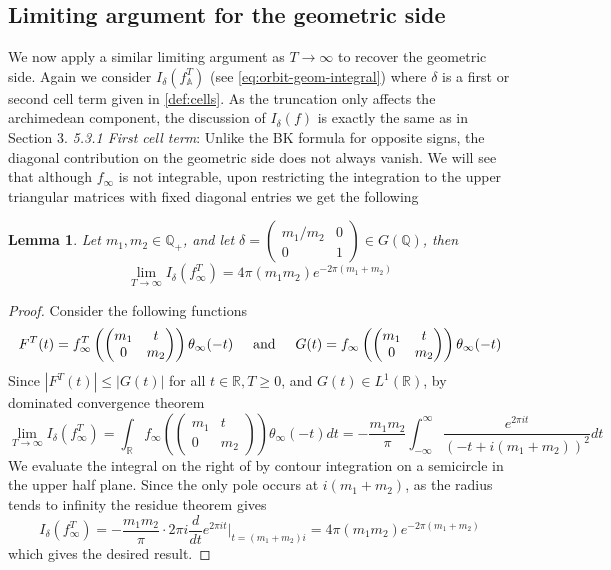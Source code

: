 \documentclass{article}
\newtheorem{lemma}[theorem]{Lemma}
\numberwithin{equation}{section}
\begin{document}
\subsection{Limiting argument for the geometric side}
We now apply a similar limiting argument as $T \to \infty$ to recover the geometric side. Again we consider $I_\delta(f_\mathbb{A}^T)$ (see \eqref{eq:orbit-geom-integral}) where $\delta$ is a first or second cell term given in \eqref{def:cells}. As the truncation only affects the archimedean component, the discussion of $I_\delta(f)$ is exactly the same as in Section 3. \bigbreak 
\noindent \emph{5.3.1 First cell term}: Unlike the BK formula for opposite signs, the diagonal contribution on the geometric side does not always vanish. We will see that although $f_\infty$ is not integrable, upon restricting the integration to the upper triangular matrices with fixed diagonal entries we get the following
\begin{lemma}
Let $m_1, m_2 \in \mathbb{Q}_+$, and let $\delta = \left(\begin{smallmatrix}
    m_1/m_2 & 0 \\ 0 & 1
\end{smallmatrix}\right) \in G(\mathbb{Q})$,  then 
\begin{equation}
    \lim_{T \to \infty}I_\delta(f_\infty^T)= 4\pi(m_1m_2)e^{-2\pi(m_1+m_2)}
\end{equation}
\end{lemma}
\begin{proof}
    Consider the following functions
    $$F^T(t)=f_\infty^T\left(\begin{pmatrix}
        m_1 & t \\ 0 & m_2
    \end{pmatrix} \right)\theta_\infty(-t) \hspace{0.5cm} \text{and} \hspace{0.5cm} G(t)=f_\infty \left(\begin{pmatrix}
        m_1 & t \\ 0 & m_2
    \end{pmatrix} \right)\theta_\infty(-t)$$
    Since $|F^T(t)|\leq |G(t)|$ for all $t \in \mathbb{R}, T \geq 0$, and $G(t)\in L^1(\mathbb{R})$, by dominated convergence theorem
\begin{equation}
    \lim_{T \to \infty} I_{\delta}(f_\infty^T) = \int_{\mathbb R}f_{\infty}\left(\begin{pmatrix}
        m_1 & t \\ 0 & m_2 
    \end{pmatrix} \right)\theta_{\infty}(-t)dt= -\frac{m_1m_2}{\pi}\int_{-\infty}^{\infty}\frac{e^{2\pi it}}{(-t+i(m_1+m_2))^2}dt
\end{equation}
We evaluate the integral on the right of by contour integration on a semicircle in the upper half plane. Since the only pole occurs at $i(m_1+m_2)$, as the radius tends to infinity the residue theorem gives
$$I_\delta(f_\infty^T) =-\frac{m_1m_2}{\pi}\cdot 2\pi i \frac{d}{dt}e^{2\pi it} \Bigr|_{t=(m_1+m_2)i} = 4\pi(m_1m_2)e^{-2\pi (m_1+m_2)}$$
which gives the desired result.
\end{proof}
\end{document}
